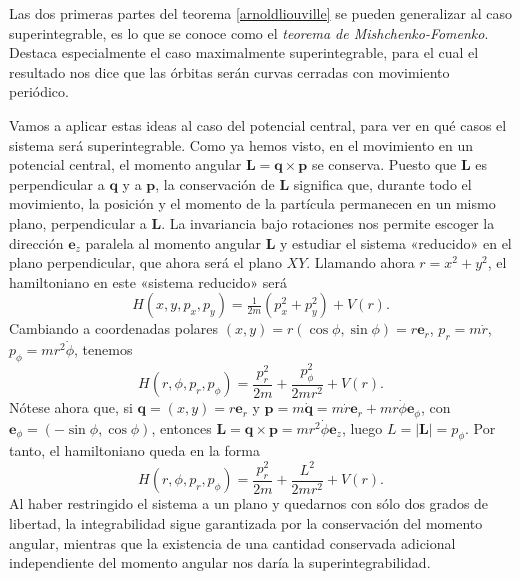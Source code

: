 \documentclass[12pt,a4paper,twocolumn,reqno]{amsart}
\theoremstyle{definition} \newtheorem{defn}[thm]{Definición}
\theoremstyle{definition} \newtheorem{ejemplo}[thm]{Ejemplo}
\theoremstyle{definition} \newtheorem{ejercicio}[thm]{Ejercicio}
\theoremstyle{remark} \newtheorem*{obs}{Observación}
\newcommand{\vect}[1]{\mathbf{#1}}
\begin{document}
  Las dos primeras partes del teorema \ref{arnoldliouville} se pueden generalizar al caso superintegrable, es lo que se conoce como el \emph{teorema de Mishchenko-Fomenko}. Destaca especialmente el caso maximalmente superintegrable, para el cual el resultado nos dice que las órbitas serán curvas cerradas con movimiento periódico.

  Vamos a aplicar estas ideas al caso del potencial central, para ver en qué casos el sistema será superintegrable. Como ya hemos visto, en el movimiento en un potencial central, el momento angular $\vect{L}=\vect{q}\times \vect{p}$ se conserva. Puesto que $\vect{L}$ es perpendicular a $\vect{q}$ y a $\vect{p}$, la conservación de $\vect{L}$ significa que, durante todo el movimiento, la posición y el momento de la partícula permanecen en un mismo plano, perpendicular a $\vect{L}$. La invariancia bajo rotaciones nos permite escoger la dirección $\vect{e}_z$ paralela al momento angular $\vect{L}$ y estudiar el sistema «reducido» en el plano perpendicular, que ahora será el plano $XY$. Llamando ahora $r=x^2+y^2$, el hamiltoniano en este «sistema reducido» será
  \begin{equation}
    H(x,y,p_x,p_y)= \tfrac{1}{2m}(p_x^2+p_y^2)+V(r).
  \end{equation}
  Cambiando a coordenadas polares $(x,y)=r(\cos \phi, \sin \phi)=r\vect{e}_{r}$, $p_r=m\dot r$, $p_{\phi}=mr^2\dot \phi$, tenemos
  \begin{equation}
    H(r,\phi,p_r,p_{\phi})=\frac{p_r^2}{2m}+\frac{p_{\phi}^2}{2mr^2}+V(r). 
  \end{equation}
  Nótese ahora que, si $\vect{q}=(x,y)=r\vect{e}_r$ y $\vect{p}=m\dot{\vect{q}}=m\dot r \vect{e}_r + mr \dot \phi \vect{e}_{\phi}$, con $\vect{e}_{\phi}=(-\sin \phi,\cos \phi)$, entonces $\vect{L}=\vect{q}\times \vect{p}=mr^2\dot \phi \vect{e}_z$, luego $L=|\vect{L}|=p_{\phi}$. Por tanto, el hamiltoniano queda en la forma
  \begin{equation}
    H(r,\phi,p_r,p_{\phi})=\frac{p_r^2}{2m}+\frac{L^2}{2mr^2}+V(r). 
  \end{equation}
  Al haber restringido el sistema a un plano y quedarnos con sólo dos grados de libertad, la integrabilidad sigue garantizada por la conservación del momento angular, mientras que la existencia de una cantidad conservada adicional independiente del momento angular nos daría la superintegrabilidad.
\end{document}
